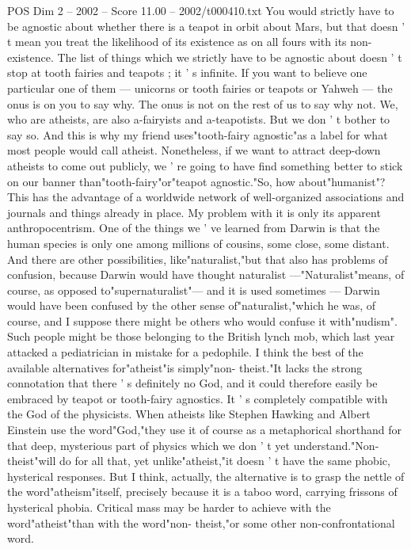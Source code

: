 \begin{textsample}{POS Dim 2 – 2002 – Score 11.00 – 2002/t000410.txt}
You would strictly have to be agnostic about whether there is a teapot in orbit about Mars, but that doesn ' t mean you treat the likelihood of its existence as on all fours with its non-existence.
The list of things which we strictly have to be agnostic about doesn ' t stop at tooth fairies and teapots ; it ' s infinite.
If you want to believe one particular one of them — unicorns or tooth fairies or teapots or Yahweh — the onus is on you to say why.
The onus is not on the rest of us to say why not.
We, who are atheists, are also a-fairyists and a-teapotists.
But we don ' t bother to say so.
And this is why my friend uses"tooth-fairy agnostic"as a label for what most people would call atheist.
Nonetheless, if we want to attract deep-down atheists to come out publicly, we ' re going to have find something better to stick on our banner than"tooth-fairy"or"teapot agnostic."So, how about"humanist"?
This has the advantage of a worldwide network of well-organized associations and journals and things already in place.
My problem with it is only its apparent anthropocentrism.
One of the things we ' ve learned from Darwin is that the human species is only one among millions of cousins, some close, some distant.
And there are other possibilities, like"naturalist,"but that also has problems of confusion, because Darwin would have thought naturalist —"Naturalist"means, of course, as opposed to"supernaturalist"— and it is used sometimes — Darwin would have been confused by the other sense of"naturalist,"which he was, of course, and I suppose there might be others who would confuse it with"nudism".
Such people might be those belonging to the British lynch mob, which last year attacked a pediatrician in mistake for a pedophile.
I think the best of the available alternatives for"atheist"is simply"non- theist."It lacks the strong connotation that there ' s definitely no God, and it could therefore easily be embraced by teapot or tooth-fairy agnostics.
It ' s completely compatible with the God of the physicists.
When atheists like Stephen Hawking and Albert Einstein use the word"God,"they use it of course as a metaphorical shorthand for that deep, mysterious part of physics which we don ' t yet understand."Non-theist"will do for all that, yet unlike"atheist,"it doesn ' t have the same phobic, hysterical responses.
But I think, actually, the alternative is to grasp the nettle of the word"atheism"itself, precisely because it is a taboo word, carrying frissons of hysterical phobia.
Critical mass may be harder to achieve with the word"atheist"than with the word"non- theist,"or some other non-confrontational word.

\end{textsample}
